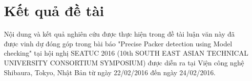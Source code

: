 \section{Kết quả đề tài}

\hspace{0.5cm}Nội dung và kết quả nghiên cứu được thực hiện trong đề tài luận văn này đã được vinh dự đóng góp trong bài báo "Precise Packer detection using Model checking" tại hội nghị SEATUC 2016 (10th SOUTH EAST ASIAN TECHNICAL UNIVERSITY CONSORTIUM SYMPOSIUM) được diễn ra tại Viện công nghệ Shibaura, Tokyo, Nhật Bản từ ngày 22/02/2016 đến ngày 24/02/2016.
